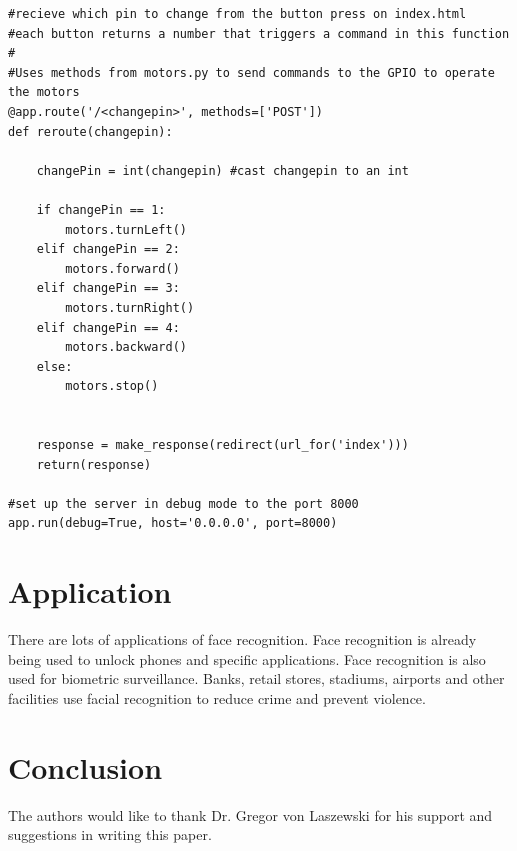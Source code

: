 \documentclass[sigconf]{acmart}
\begin{document}
\begin{lstlisting}
#recieve which pin to change from the button press on index.html
#each button returns a number that triggers a command in this function
#
#Uses methods from motors.py to send commands to the GPIO to operate the motors
@app.route('/<changepin>', methods=['POST'])
def reroute(changepin):

	changePin = int(changepin) #cast changepin to an int

	if changePin == 1:
		motors.turnLeft()
	elif changePin == 2:
		motors.forward()
	elif changePin == 3:
		motors.turnRight()
	elif changePin == 4:
		motors.backward()
	else:
		motors.stop()


	response = make_response(redirect(url_for('index')))
	return(response)

#set up the server in debug mode to the port 8000
app.run(debug=True, host='0.0.0.0', port=8000) 
\end{lstlisting}

\section{Application}
There are lots of applications of face recognition. Face recognition is already being used to unlock phones and specific applications. Face recognition is also used for biometric surveillance. Banks, retail stores, stadiums, airports and other facilities use facial recognition to reduce crime and prevent violence.

\section{Conclusion}


\begin{acks}

The authors would like to thank Dr. Gregor von Laszewski for his support and suggestions in writing this paper.

\end{acks}


 
\end{document}
